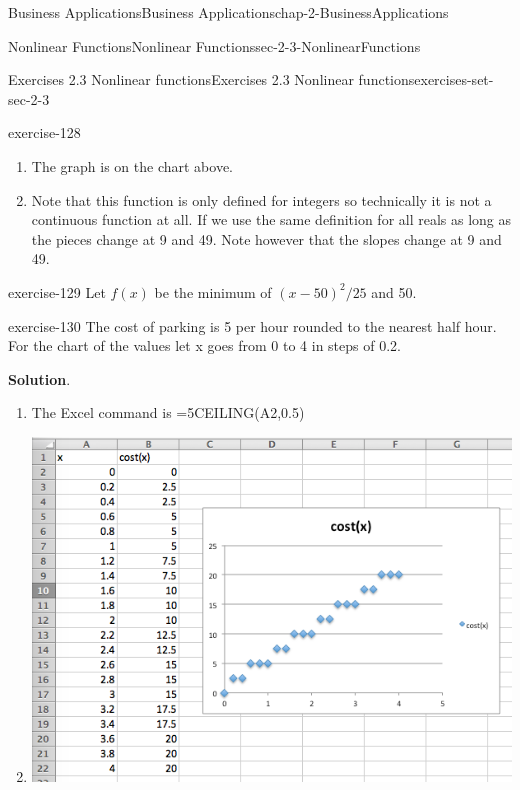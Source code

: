 \documentclass[oneside,10pt,]{book}
\numberwithin{equation}{section}
\begin{document}
\begin{chapterptx}{Business Applications}{}{Business Applications}{}{}{chap-2-BusinessApplications}
\begin{sectionptx}{Nonlinear Functions}{}{Nonlinear Functions}{}{}{sec-2-3-NonlinearFunctions}
\begin{exercises-subsection-numberless}{Exercises 2.3 Nonlinear functions}{}{Exercises 2.3 Nonlinear functions}{}{}{exercises-set-sec-2-3}
\begin{exercisegroup}
\begin{divisionexerciseeg}{13}{}{}{exercise-128}
\begin{enumerate}[label=(\alph*)]
\begin{sidebyside}{1}{0.05}{0.05}{0}
\begin{sbspanel}{0.9}
\end{sbspanel}%
\end{sidebyside}%
%
\item\hypertarget{li-250}{}\hypertarget{p-860}{}%
The graph is on the chart above.%
\item\hypertarget{li-251}{}\hypertarget{p-861}{}%
Note that this function is only defined for integers so technically it is not a continuous function at all. If we use the same definition for all reals as long as the pieces change at 9 and 49.  Note however that the slopes change at 9 and 49.%
\end{enumerate}
\end{divisionexerciseeg}%
\begin{divisionexerciseeg}{14}{}{}{exercise-129}%
\hypertarget{p-862}{}%
Let \(f(x)\) be the minimum of \((x-50)^2/25\) and 50.%
\end{divisionexerciseeg}%
\begin{divisionexerciseeg}{15}{}{}{exercise-130}%
\hypertarget{p-863}{}%
The cost of parking is \textdollar{}5 per hour rounded to the nearest half hour.  For the chart of the values let x goes from 0 to 4 in steps of 0.2.%
\par\smallskip%
\noindent\textbf{Solution}.\hypertarget{solution-63}{}\quad%
\leavevmode%
\begin{enumerate}[label=(\alph*)]
\item\hypertarget{li-252}{}\hypertarget{p-864}{}%
The Excel command is =5\textasteriskcentered{}CEILING(A2,0.5)%
\item\hypertarget{li-253}{}\leavevmode%
\begin{sidebyside}{1}{0.05}{0.05}{0}%
\begin{sbspanel}{0.9}%
\includegraphics[width=1\linewidth]{images/sec2-3-sol15a.png}

\end{sbspanel}
\end{sidebyside}
\end{enumerate}
\end{divisionexerciseeg}
\end{exercisegroup}
\end{exercises-subsection-numberless}
\end{sectionptx}
\end{chapterptx}
\end{document}

